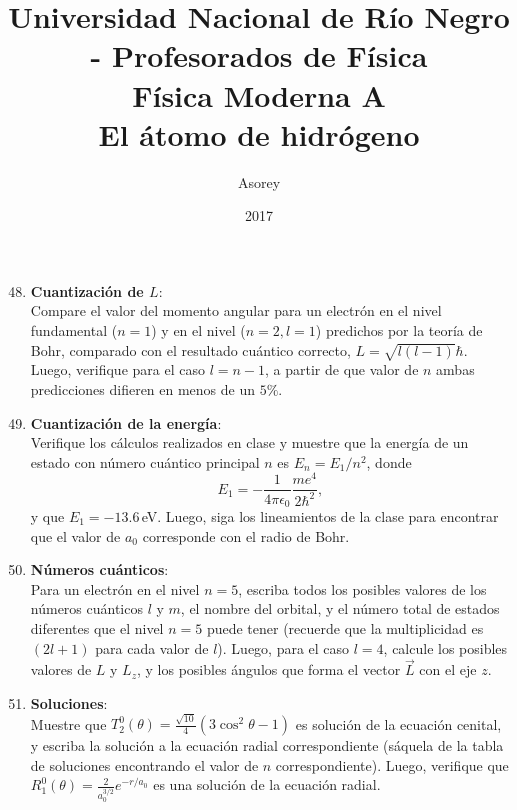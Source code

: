 \documentclass[a4paper,12pt]{article}
\begin{document}
\title{
{\normalsize{Universidad Nacional de Río Negro - Profesorados de Física}}\\
Física Moderna A \\ El átomo de hidrógeno\\}
\author{Asorey}
\date{2017}
\maketitle

\begin{enumerate}
	\setcounter{enumi}{47}      %
	
	\item {\bf{Cuantización de $L$}}:\\
		Compare el valor del momento angular para un electrón en el nivel
		fundamental ($n=1$) y en el nivel ($n=2, l=1$) predichos por la teoría
		de Bohr, comparado con el resultado cuántico correcto, $L=\sqrt{l(l-1)}
		\hbar$. Luego, verifique para el caso $l=n-1$, a partir de que valor de
		$n$ ambas predicciones difieren en menos de un $5\%$. 

	\item {\bf{Cuantización de la energía}}:\\
		Verifique los cálculos realizados en clase y muestre que la energía de
		un estado con número cuántico principal $n$ es $E_n=E_1 / n^2$, donde
		$$E_1= -\frac{1}{4\pi\epsilon_0} \frac{m e^4}{2\hbar^2},$$ y que
		$E_1=-13.6$\,eV. Luego, siga los lineamientos de la clase para
		encontrar que el valor de $a_0$ corresponde con el radio de Bohr.

	\item {\bf{Números cuánticos}}:\\ 
		Para un electrón en el nivel $n=5$, escriba todos los posibles
		valores de los números cuánticos $l$ y $m$, el nombre del orbital, y el
		número total de estados diferentes que el nivel $n=5$ puede tener
		(recuerde que la multiplicidad es $(2l+1)$ para cada valor de $l$).
		Luego, para el caso $l=4$, calcule los posibles valores de $L$ y $L_z$,
		y los posibles ángulos que forma el vector $\vec L$ con el eje $z$.

	\item {\bf{Soluciones}}:\\
		Muestre que $T_2^0(\theta) = \frac{\sqrt{10}}{4} (3 \cos^2 \theta - 1)$
		es solución de la ecuación cenital, y escriba la solución a la ecuación
		radial correspondiente (sáquela de la tabla de soluciones encontrando
		el valor de $n$ correspondiente). Luego, verifique que $R_1^0(\theta) =
		\frac{2}{a_0^{3/2}} e^{-r/a_0}$ es una solución de la ecuación radial.


\end{enumerate}
\end{document}
